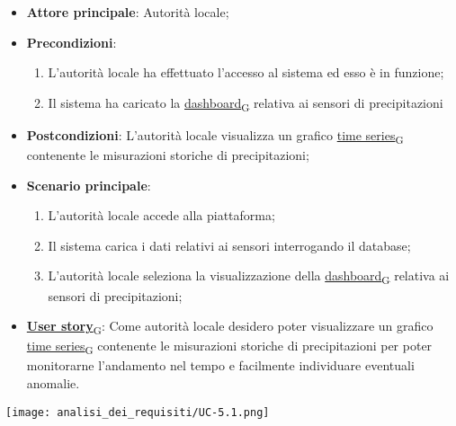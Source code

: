 \begin{itemize}
	\item \textbf{Attore principale}: Autorità locale;
	\item \textbf{Precondizioni}:
	      \begin{enumerate}
		      \item L'autorità locale ha effettuato l'accesso al sistema ed esso è in funzione;
		      \item Il sistema ha caricato la \href{https://7last.github.io/docs/rtb/documentazione-interna/glossario\#dashboard}{dashboard\textsubscript{G}} relativa ai sensori di precipitazioni
	      \end{enumerate}
	\item \textbf{Postcondizioni}: L'autorità locale visualizza un grafico \href{https://7last.github.io/docs/rtb/documentazione-interna/glossario\#time-series}{time series\textsubscript{G}} contenente le misurazioni storiche
	      di precipitazioni;
	\item \textbf{Scenario principale}:
	      \begin{enumerate}
		      \item L'autorità locale accede alla piattaforma;
		      \item Il sistema carica i dati relativi ai sensori interrogando il database;
		      \item L'autorità locale seleziona la visualizzazione della \href{https://7last.github.io/docs/rtb/documentazione-interna/glossario\#dashboard}{dashboard\textsubscript{G}} relativa ai sensori di precipitazioni;
	      \end{enumerate}
	\item \href{https://7last.github.io/docs/rtb/documentazione-interna/glossario\#user-story}{\textbf{User story}\textsubscript{G}}:
	      Come autorità locale desidero poter visualizzare un grafico \href{https://7last.github.io/docs/rtb/documentazione-interna/glossario\#time-series}{time series\textsubscript{G}} contenente le misurazioni storiche
	      di precipitazioni per poter monitorarne l'andamento nel tempo e facilmente individuare eventuali anomalie.
\end{itemize}
\begin{center}
	\texttt{[image: analisi\_dei\_requisiti/UC-5.1.png]}
\end{center}

